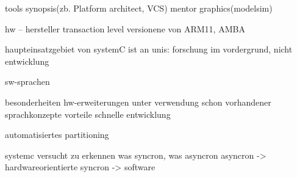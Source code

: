 	tools
synopsis(zb. Platform architect, VCS)
mentor graphics(modelsim)
	
	hw – hersteller
transaction level versionene von ARM11, AMBA

	haupteinsatzgebiet von systemC ist an unis: forschung im vordergrund, nicht entwicklung
	
sw-sprachen

	besonderheiten
		hw-erweiterungen unter verwendung schon vorhandener sprachkonzepte
	vorteile
		schnelle entwicklung

	automatisiertes partitioning

	systemc versucht zu erkennen was syncron, was asyncron
		asyncron -> hardwareorientierte
		syncron -> software 
